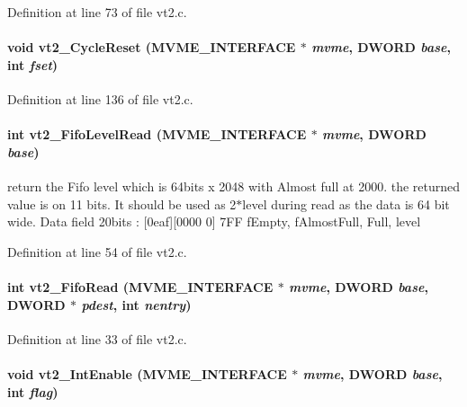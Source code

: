 Definition at line 73 of file vt2.c.
\paragraph[{vt2\_\-CycleReset}]{\setlength{\rightskip}{0pt plus 5cm}void vt2\_\-CycleReset ({\bf MVME\_\-INTERFACE} $\ast$ {\em mvme}, \/  {\bf DWORD} {\em base}, \/  int {\em fset})}\hfill\label{vt2_8c_ada48b3ed0fd135d6f2331be031c802b4}


Definition at line 136 of file vt2.c.
\paragraph[{vt2\_\-FifoLevelRead}]{\setlength{\rightskip}{0pt plus 5cm}int vt2\_\-FifoLevelRead ({\bf MVME\_\-INTERFACE} $\ast$ {\em mvme}, \/  {\bf DWORD} {\em base})}\hfill\label{vt2_8c_ae99f1221836d1b970dc145ad8b0e53b7}
return the Fifo level which is 64bits x 2048 with Almost full at 2000. the returned value is on 11 bits. It should be used as 2$\ast$level during read as the data is 64 bit wide. Data field 20bits : \mbox{[}0eaf\mbox{]}\mbox{[}0000 0\mbox{]} 7FF fEmpty, fAlmostFull, Full, level 

Definition at line 54 of file vt2.c.
\paragraph[{vt2\_\-FifoRead}]{\setlength{\rightskip}{0pt plus 5cm}int vt2\_\-FifoRead ({\bf MVME\_\-INTERFACE} $\ast$ {\em mvme}, \/  {\bf DWORD} {\em base}, \/  {\bf DWORD} $\ast$ {\em pdest}, \/  int {\em nentry})}\hfill\label{vt2_8c_a2657478442a3f8a32a09c79a3f57a341}


Definition at line 33 of file vt2.c.
\paragraph[{vt2\_\-IntEnable}]{\setlength{\rightskip}{0pt plus 5cm}void vt2\_\-IntEnable ({\bf MVME\_\-INTERFACE} $\ast$ {\em mvme}, \/  {\bf DWORD} {\em base}, \/  int {\em flag})}\hfill\label{vt2_8c_a9f8c0aa414c2a9932b437f42805ff300}


